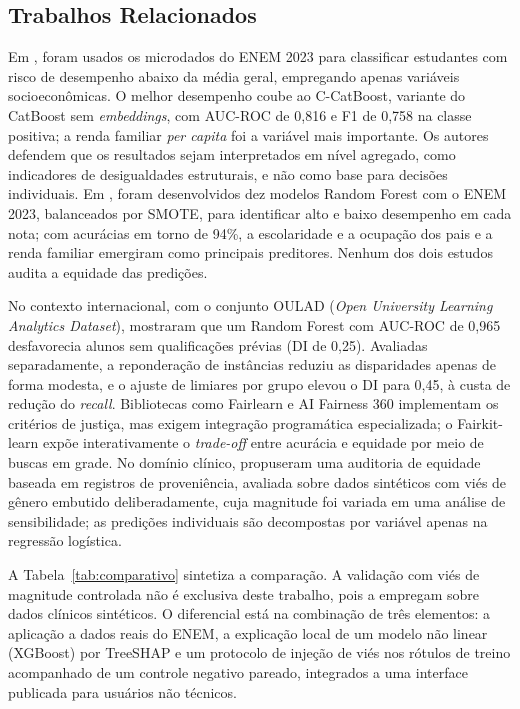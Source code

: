 \subsection{Trabalhos Relacionados}
\label{sec:trabalhos}

Em \cite{luz2025uso}, foram usados os microdados do ENEM 2023 para classificar estudantes com risco de desempenho abaixo da média geral, empregando apenas variáveis socioeconômicas. O melhor desempenho coube ao C-CatBoost, variante do CatBoost sem \textit{embeddings}, com AUC-ROC de 0,816 e F1 de 0,758 na classe positiva; a renda familiar \textit{per capita} foi a variável mais importante. Os autores defendem que os resultados sejam interpretados em nível agregado, como indicadores de desigualdades estruturais, e não como base para decisões individuais. Em \cite{souza2025desigualdades}, foram desenvolvidos dez modelos Random Forest com o ENEM 2023, balanceados por SMOTE, para identificar alto e baixo desempenho em cada nota; com acurácias em torno de 94\%, a escolaridade e a ocupação dos pais e a renda familiar emergiram como principais preditores. Nenhum dos dois estudos audita a equidade das predições.

No contexto internacional, com o conjunto OULAD (\textit{Open University Learning Analytics Dataset}), \cite{aoudi2025fairness} mostraram que um Random Forest com AUC-ROC de 0,965 desfavorecia alunos sem qualificações prévias (DI de 0,25). Avaliadas separadamente, a reponderação de instâncias reduziu as disparidades apenas de forma modesta, e o ajuste de limiares por grupo elevou o DI para 0,45, à custa de redução do \textit{recall}. Bibliotecas como Fairlearn \cite{bird2020fairlearn} e AI Fairness 360 \cite{bellamy2018aif360} implementam os critérios de justiça, mas exigem integração programática especializada; o Fairkit-learn \cite{johnson2022fairkit} expõe interativamente o \textit{trade-off} entre acurácia e equidade por meio de buscas em grade. No domínio clínico, \cite{alu2026auditing} propuseram uma auditoria de equidade baseada em registros de proveniência, avaliada sobre dados sintéticos com viés de gênero embutido deliberadamente, cuja magnitude foi variada em uma análise de sensibilidade; as predições individuais são decompostas por variável apenas na regressão logística.

A Tabela~\ref{tab:comparativo} sintetiza a comparação. A validação com viés de magnitude controlada não é exclusiva deste trabalho, pois \cite{alu2026auditing} a empregam sobre dados clínicos sintéticos. O diferencial está na combinação de três elementos: a aplicação a dados reais do ENEM, a explicação local de um modelo não linear (XGBoost) por TreeSHAP e um protocolo de injeção de viés nos rótulos de treino acompanhado de um controle negativo pareado, integrados a uma interface publicada para usuários não técnicos.

